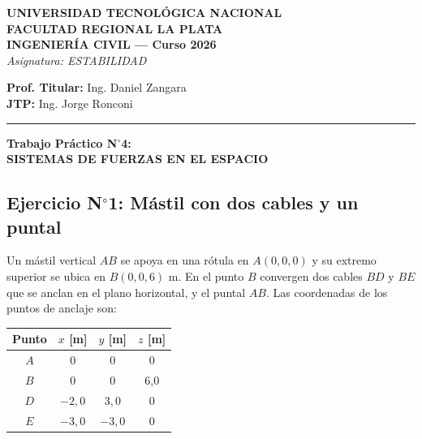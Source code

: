\documentclass[11pt,a4paper]{article}
\begin{document}
\begin{center}
    \textbf{UNIVERSIDAD TECNOLÓGICA NACIONAL \\ FACULTAD REGIONAL LA PLATA} \\
    \vspace{0.2cm}
    \textbf{INGENIERÍA CIVIL — Curso 2026} \\
    \vspace{0.2cm}
    \textit{Asignatura: ESTABILIDAD}
\end{center}

\vspace{0.3cm}

\begin{flushleft}
    \textbf{Prof. Titular:} Ing. Daniel Zangara \\
    \textbf{JTP:} Ing. Jorge Ronconi \\
\end{flushleft}

\noindent\rule{\linewidth}{0.4pt}

\begin{center}
    \vspace{0.4cm}
    \Large \textbf{Trabajo Práctico N$^\circ$4:\\ SISTEMAS DE FUERZAS EN EL ESPACIO} \\
    \vspace{0.4cm}
\end{center}

\subsection*{Ejercicio N$^\circ$1: Mástil con dos cables y un puntal}

Un mástil vertical $AB$ se apoya en una rótula en $A(0,0,0)$ y su extremo
superior se ubica en $B(0,0,6)$ m. En el punto $B$ convergen dos cables
$BD$ y $BE$ que se anclan en el plano horizontal, y el puntal $AB$.
Las coordenadas de los puntos de anclaje son:

\begin{center}
\begin{tabular}{cccc}
\hline
\textbf{Punto} & $x$ [m] & $y$ [m] & $z$ [m] \\
\hline
$A$ & 0 & 0 & 0 \\
$B$ & 0 & 0 & 6{,}0 \\
$D$ & $-2{,}0$ & $3{,}0$ & 0 \\
$E$ & $-3{,}0$ & $-3{,}0$ & 0 \\
\hline
\end{tabular}
\end{center}
\end{document}
